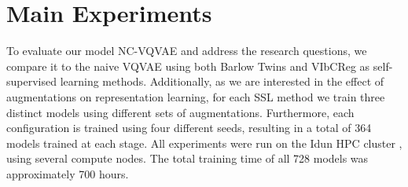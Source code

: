 \documentclass[../../thesis.tex]{subfiles}
\begin{document}




\section{Main Experiments}

To evaluate our model NC-VQVAE and address the research questions, we compare it to the naive VQVAE using both Barlow Twins and VIbCReg as self-supervised learning methods. Additionally, as we are interested in the effect of augmentations on representation learning, for each SSL method we train three distinct models using different sets of augmentations. Furthermore, each configuration is trained using four different seeds, resulting in a total of 364 models trained at each stage. All experiments were run on the Idun HPC cluster \cite{Idun}, using several compute nodes. The total training time of all 728 models was approximately 700 hours. 
\end{document}
